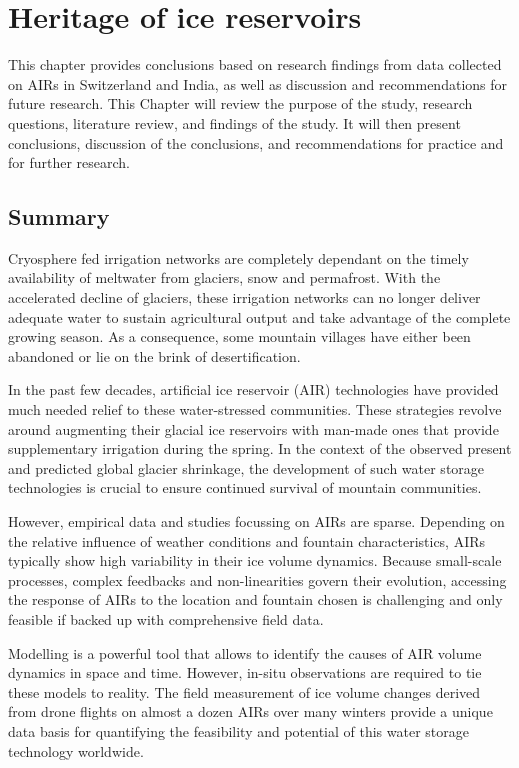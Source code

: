 \chapter{Heritage of ice reservoirs}

This chapter provides conclusions based on research findings from data collected on AIRs in Switzerland and India,
as well as discussion and recommendations for future research. This Chapter will review the purpose of the
study, research questions, literature review, and findings of the study. It will then present conclusions,
discussion of the conclusions, and recommendations for practice and for further research.

\section{Summary}

Cryosphere fed irrigation networks are completely dependant on the timely availability of meltwater from
glaciers, snow and permafrost. With the accelerated decline of glaciers, these irrigation networks can no longer
deliver adequate water to sustain agricultural output and take advantage of the complete growing season. As a
consequence, some mountain villages have either been abandoned or lie on the brink of desertification.

In the past few decades, artificial ice reservoir (AIR) technologies have provided much needed relief to these
water-stressed communities. These strategies revolve around augmenting their glacial ice reservoirs with
man-made ones that provide supplementary irrigation during the spring. In the context of the observed present
and predicted global glacier shrinkage, the development of such water storage technologies is crucial to ensure
continued survival of mountain communities.

However, empirical data and studies focussing on AIRs are sparse. Depending on the relative influence of weather
conditions and fountain characteristics, AIRs typically show high variability in their ice volume dynamics.
Because small-scale processes, complex feedbacks and non-linearities govern their evolution, accessing the
response of AIRs to the location and fountain chosen is challenging and only feasible if backed up with
comprehensive field data. 

Modelling is a powerful tool that allows to identify the causes of AIR volume dynamics in space and time.
However, in-situ observations are required to tie these models to reality. The field measurement of ice volume
changes derived from drone flights on almost a dozen AIRs over many winters provide a unique data basis for
quantifying the feasibility and potential of this water storage technology worldwide.

